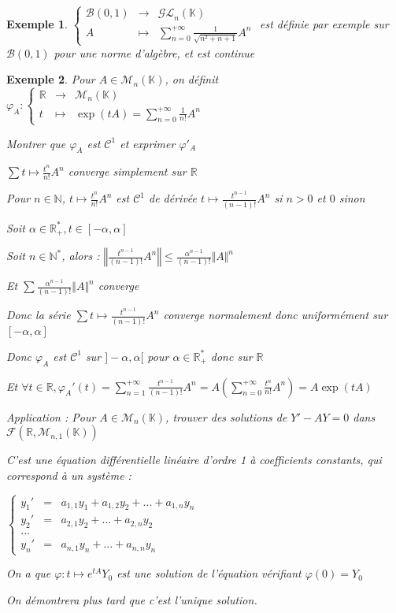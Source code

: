 \documentclass[a4paper,12pt]{book}
\newtheorem{Exe}{Exemple}[section]
\def\R{\mathbb{R}}
\def\N{\mathbb{N}}
\def\K{\mathbb{K}}
\begin{document}
\begin{Exe}
$\left\{\begin{array}{rcl}\mathcal{B}(0,1) & \to & \mathcal{GL}_n(\K) \\ A & \mapsto & \sum\limits_{n=0}^{+\infty} \frac{1}{\sqrt{n^2+n+1}}A^n\end{array}\right.$ est définie par exemple sur $\mathcal{B}(0,1)$ pour une norme d'algèbre, et est continue
\end{Exe}
\begin{Exe}
Pour $A\in \mathcal{M}_n(\K)$, on définit $\varphi_A:\left\{\begin{array}{rcl}\R & \to & \mathcal{M}_n(\K) \\ t & \mapsto & \exp(tA) = \sum\limits_{n=0}^{+\infty} \frac{1}{n!}A^n\end{array}\right.$
\par Montrer que $\varphi_A$ est $\mathcal{C}^1$ et exprimer $\varphi'_A$ \par $\sum t\mapsto \frac{t^n}{n!}A^n$ converge simplement sur $\R$ \par Pour $n\in\N$, $t\mapsto \frac{t^n}{n!}A^n$ est $\mathcal{C}^1$ de dérivée $t\mapsto \frac{t^{n-1}}{(n-1)!}A^n$ si $n>0$ et $0$ sinon
\par Soit $\alpha\in\R_+^*, t\in[-\alpha, \alpha]$ \par Soit $n\in\N^*$, alors : $\left\Vert\frac{t^{n-1}}{(n-1)!}A^n\right\Vert\leq\frac{\alpha^{n-1}}{(n-1)!}\Vert A\Vert^n$ \par Et $\sum\frac{\alpha^{n-1}}{(n-1)!}\Vert A\Vert^n$ converge \par Donc la série $\sum t\mapsto \frac{t^{n-1}}{(n-1)!}A^n$ converge normalement donc uniformément sur $[-\alpha, \alpha]$
\par Donc $\varphi_A$ est $\mathcal{C}^1$ sur $]-\alpha,\alpha[$ pour $\alpha\in\R_+^*$ donc sur $\R$ \par Et $\forall t\in\R, \varphi_A'(t) = \sum\limits_{n=1}^{+\infty}\frac{t^{n-1}}{(n-1)!}A^n = A\left(\sum\limits_{n=0}^{+\infty}\frac{t^n}{n!}A^n\right) = A\exp(tA)$
\par Application : Pour $A\in\mathcal{M}_n(\K)$, trouver des solutions de  $Y'-AY =0$ dans $\mathcal{F}(\R,\mathcal{M}_{n,1}(\K))$ \par C'est une équation différentielle linéaire d'ordre 1 à coefficients constants, qui correspond à un système :
\par $\left\{\begin{array}{rcl} y_1'& = &a_{1,1}y_1 + a_{1,2}y_2 +...+a_{1,n}y_n \\ y_2'& = & a_{2,1}y_2+...+a_{2,n}y_2 \\ ... & &  \\ y_n' &=& a_{n,1}y_n+...+a_{n,n}y_n \end{array}\right.$ \par On a que $\varphi:t\mapsto e^{tA}Y_0$ est une solution de l'équation vérifiant $\varphi(0)=Y_0$ \par On démontrera plus tard que c'est l'unique solution.
\end{Exe}
\end{document}
